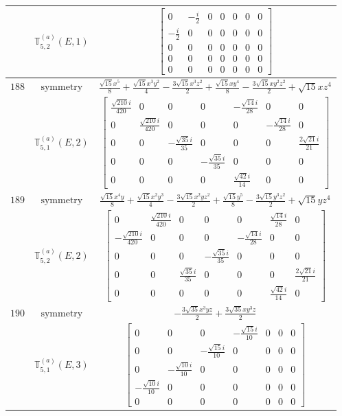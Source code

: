 \documentclass[fleqn,8pt,landscape]{jsarticle}
\begin{document}
\begin{longtable}{ccc}
$  $ & $ \mathbb{T}_{5,2}^{(a)}(E,1) $ & $ \begin{bmatrix} 0 & - \frac{i}{2} & 0 & 0 & 0 & 0 & 0 \\ - \frac{i}{2} & 0 & 0 & 0 & 0 & 0 & 0 \\ 0 & 0 & 0 & 0 & 0 & 0 & 0 \\ 0 & 0 & 0 & 0 & 0 & 0 & 0 \\ 0 & 0 & 0 & 0 & 0 & 0 & 0 \end{bmatrix} $ \\ \hline
$ 188 $ & $ \text{symmetry} $ & $ \frac{\sqrt{15} x^{5}}{8} + \frac{\sqrt{15} x^{3} y^{2}}{4} - \frac{3 \sqrt{15} x^{3} z^{2}}{2} + \frac{\sqrt{15} x y^{4}}{8} - \frac{3 \sqrt{15} x y^{2} z^{2}}{2} + \sqrt{15} x z^{4} $ \\
$  $ & $ \mathbb{T}_{5,1}^{(a)}(E,2) $ & $ \begin{bmatrix} \frac{\sqrt{210} i}{420} & 0 & 0 & 0 & - \frac{\sqrt{14} i}{28} & 0 & 0 \\ 0 & \frac{\sqrt{210} i}{420} & 0 & 0 & 0 & - \frac{\sqrt{14} i}{28} & 0 \\ 0 & 0 & - \frac{\sqrt{35} i}{35} & 0 & 0 & 0 & \frac{2 \sqrt{21} i}{21} \\ 0 & 0 & 0 & - \frac{\sqrt{35} i}{35} & 0 & 0 & 0 \\ 0 & 0 & 0 & 0 & \frac{\sqrt{42} i}{14} & 0 & 0 \end{bmatrix} $ \\ \hline
$ 189 $ & $ \text{symmetry} $ & $ \frac{\sqrt{15} x^{4} y}{8} + \frac{\sqrt{15} x^{2} y^{3}}{4} - \frac{3 \sqrt{15} x^{2} y z^{2}}{2} + \frac{\sqrt{15} y^{5}}{8} - \frac{3 \sqrt{15} y^{3} z^{2}}{2} + \sqrt{15} y z^{4} $ \\
$  $ & $ \mathbb{T}_{5,2}^{(a)}(E,2) $ & $ \begin{bmatrix} 0 & \frac{\sqrt{210} i}{420} & 0 & 0 & 0 & \frac{\sqrt{14} i}{28} & 0 \\ - \frac{\sqrt{210} i}{420} & 0 & 0 & 0 & - \frac{\sqrt{14} i}{28} & 0 & 0 \\ 0 & 0 & 0 & - \frac{\sqrt{35} i}{35} & 0 & 0 & 0 \\ 0 & 0 & \frac{\sqrt{35} i}{35} & 0 & 0 & 0 & \frac{2 \sqrt{21} i}{21} \\ 0 & 0 & 0 & 0 & 0 & \frac{\sqrt{42} i}{14} & 0 \end{bmatrix} $ \\ \hline
$ 190 $ & $ \text{symmetry} $ & $ - \frac{3 \sqrt{35} x^{3} y z}{2} + \frac{3 \sqrt{35} x y^{3} z}{2} $ \\
$  $ & $ \mathbb{T}_{5,1}^{(a)}(E,3) $ & $ \begin{bmatrix} 0 & 0 & 0 & - \frac{\sqrt{15} i}{10} & 0 & 0 & 0 \\ 0 & 0 & - \frac{\sqrt{15} i}{10} & 0 & 0 & 0 & 0 \\ 0 & - \frac{\sqrt{10} i}{10} & 0 & 0 & 0 & 0 & 0 \\ - \frac{\sqrt{10} i}{10} & 0 & 0 & 0 & 0 & 0 & 0 \\ 0 & 0 & 0 & 0 & 0 & 0 & 0 \end{bmatrix} $ \\ \hline

\end{longtable}
\end{document}
